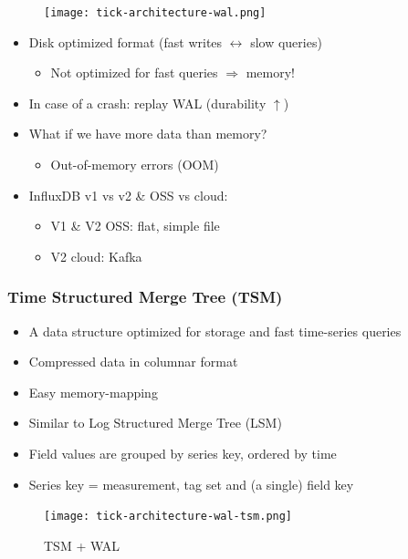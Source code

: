 \documentclass{article}
\begin{document}
\begin{figure}[H]
    \centering
    \texttt{[image: tick-architecture-wal.png]}
\end{figure}

\begin{itemize}
    \item Disk optimized format (fast writes $\leftrightarrow$ slow queries)
    \begin{itemize}
        \item Not optimized for fast queries $\Rightarrow$ memory!
    \end{itemize}
    \item In case of a crash: replay WAL (durability $\uparrow$)
    \item What if we have more data than memory?
    \begin{itemize}
        \item Out-of-memory errors (OOM)
    \end{itemize}
    \item InfluxDB v1 vs v2  \& OSS vs cloud:
    \begin{itemize}
        \item V1 \& V2 OSS: flat, simple file
        \item V2 cloud: Kafka
    \end{itemize}
\end{itemize}

\subsubsection{Time Structured Merge Tree (TSM)}

\begin{itemize}
    \item A data structure optimized for storage and fast time-series queries
    \item Compressed data in columnar format
    \item Easy memory-mapping
    \item Similar to Log Structured Merge Tree (LSM)
    \item Field values are grouped by series key, ordered by time
    \item Series key = measurement, tag set and (a single) field key
\end{itemize}

\begin{figure}[H]
    \centering
    \texttt{[image: tick-architecture-wal-tsm.png]}
    \caption{TSM + WAL}
\end{figure}
\end{document}
